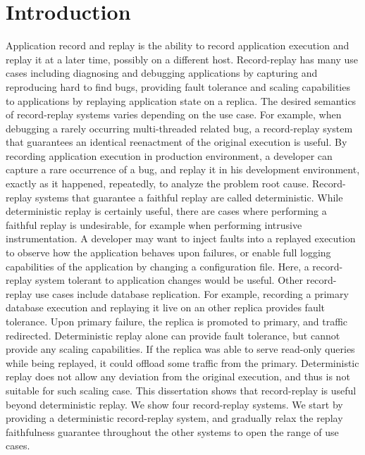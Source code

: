 \chapter{Introduction}
\label{ch:intro}

Application record and replay is the ability to record application execution and
replay it at a later time, possibly on a different host. Record-replay has many
use cases including diagnosing and debugging applications by capturing and
reproducing hard to find bugs, providing fault tolerance and scaling
capabilities to applications by replaying application state on a replica.
The desired semantics of record-replay systems varies depending on the use case.
For example, when debugging a rarely occurring multi-threaded related bug,
a record-replay system that guarantees an identical reenactment of the original
execution is useful. By recording application execution in production
environment, a developer can capture a rare occurrence of a bug, and replay it
in his development environment, exactly as it happened, repeatedly, to analyze
the problem root cause. Record-replay systems that guarantee a faithful replay
are called deterministic. While deterministic replay is certainly useful,
there are cases where performing a faithful replay is undesirable, for example
when performing intrusive instrumentation. A developer may want to inject faults
into a replayed execution to observe how the application behaves upon failures, or
enable full logging capabilities of the application by changing a configuration
file. Here, a record-replay system tolerant to application changes would be useful.
Other record-replay use cases include database replication. For example,
recording a primary database execution and replaying it live on an other
replica provides fault tolerance. Upon primary failure, the replica is
promoted to primary, and traffic redirected. Deterministic replay alone can
provide fault tolerance, but cannot provide any scaling capabilities.
If the replica was able to serve read-only queries while being replayed,
it could offload some traffic from the primary. Deterministic replay does
not allow any deviation from the original execution, and thus is not suitable
for such scaling case. This dissertation shows that record-replay is useful
beyond deterministic replay. We show four record-replay systems. We start
by providing a deterministic record-replay system, and gradually relax the
replay faithfulness guarantee throughout the other systems to open the range of
use cases.

